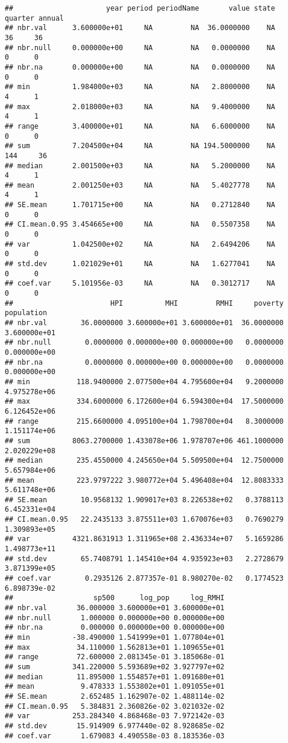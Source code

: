 \documentclass[
]{article}
\begin{document}
\begin{verbatim}
##                      year period periodName       value state quarter annual
## nbr.val      3.600000e+01     NA         NA  36.0000000    NA      36     36
## nbr.null     0.000000e+00     NA         NA   0.0000000    NA       0      0
## nbr.na       0.000000e+00     NA         NA   0.0000000    NA       0      0
## min          1.984000e+03     NA         NA   2.8000000    NA       4      1
## max          2.018000e+03     NA         NA   9.4000000    NA       4      1
## range        3.400000e+01     NA         NA   6.6000000    NA       0      0
## sum          7.204500e+04     NA         NA 194.5000000    NA     144     36
## median       2.001500e+03     NA         NA   5.2000000    NA       4      1
## mean         2.001250e+03     NA         NA   5.4027778    NA       4      1
## SE.mean      1.701715e+00     NA         NA   0.2712840    NA       0      0
## CI.mean.0.95 3.454665e+00     NA         NA   0.5507358    NA       0      0
## var          1.042500e+02     NA         NA   2.6494206    NA       0      0
## std.dev      1.021029e+01     NA         NA   1.6277041    NA       0      0
## coef.var     5.101956e-03     NA         NA   0.3012717    NA       0      0
##                       HPI          MHI         RMHI     poverty   population
## nbr.val        36.0000000 3.600000e+01 3.600000e+01  36.0000000 3.600000e+01
## nbr.null        0.0000000 0.000000e+00 0.000000e+00   0.0000000 0.000000e+00
## nbr.na          0.0000000 0.000000e+00 0.000000e+00   0.0000000 0.000000e+00
## min           118.9400000 2.077500e+04 4.795600e+04   9.2000000 4.975278e+06
## max           334.6000000 6.172600e+04 6.594300e+04  17.5000000 6.126452e+06
## range         215.6600000 4.095100e+04 1.798700e+04   8.3000000 1.151174e+06
## sum          8063.2700000 1.433078e+06 1.978707e+06 461.1000000 2.020229e+08
## median        235.4550000 4.245650e+04 5.509500e+04  12.7500000 5.657984e+06
## mean          223.9797222 3.980772e+04 5.496408e+04  12.8083333 5.611748e+06
## SE.mean        10.9568132 1.909017e+03 8.226538e+02   0.3788113 6.452331e+04
## CI.mean.0.95   22.2435133 3.875511e+03 1.670076e+03   0.7690279 1.309893e+05
## var          4321.8631913 1.311965e+08 2.436334e+07   5.1659286 1.498773e+11
## std.dev        65.7408791 1.145410e+04 4.935923e+03   2.2728679 3.871399e+05
## coef.var        0.2935126 2.877357e-01 8.980270e-02   0.1774523 6.898739e-02
##                   sp500      log_pop     log_RMHI
## nbr.val       36.000000 3.600000e+01 3.600000e+01
## nbr.null       1.000000 0.000000e+00 0.000000e+00
## nbr.na         0.000000 0.000000e+00 0.000000e+00
## min          -38.490000 1.541999e+01 1.077804e+01
## max           34.110000 1.562813e+01 1.109655e+01
## range         72.600000 2.081345e-01 3.185068e-01
## sum          341.220000 5.593689e+02 3.927797e+02
## median        11.895000 1.554857e+01 1.091680e+01
## mean           9.478333 1.553802e+01 1.091055e+01
## SE.mean        2.652485 1.162907e-02 1.488114e-02
## CI.mean.0.95   5.384831 2.360826e-02 3.021032e-02
## var          253.284340 4.868468e-03 7.972142e-03
## std.dev       15.914909 6.977440e-02 8.928685e-02
## coef.var       1.679083 4.490558e-03 8.183536e-03
\end{verbatim}
\end{document}
